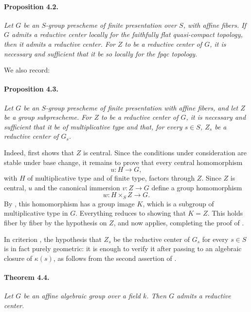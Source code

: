 \paragraph{\textbf{Proposition 4.2.}}
\emph{Let \(G\) be an \(S\)-group prescheme of finite presentation
over \(S\), with affine fibers. If \(G\) admits a reductive center
locally for the faithfully flat quasi-compact topology, then it
admits a reductive center. For \(Z\) to be a reductive center of
\(G\), it is necessary and sufficient that it be so locally for the
fpqc topology.}

We also record:

\paragraph{\textbf{Proposition 4.3.}}
\emph{Let \(G\) be an \(S\)-group prescheme of finite presentation
with affine fibers, and let \(Z\) be a group subprescheme. For \(Z\)
to be a reductive center of \(G\), it is necessary and sufficient
that it be of multiplicative type and that, for every \(s\in S\),
\(Z_s\) be a reductive center of \(G_s\).}

Indeed,  first shows that \(Z\) is central. Since the
conditions under consideration are stable under base change, it
remains to prove that every central homomorphism
\[
  u:H\longrightarrow G,
\]
with \(H\) of multiplicative type and of finite type, factors through
\(Z\). Since \(Z\) is central, \(u\) and the canonical immersion
\(v:Z\to G\) define a group homomorphism
\[
  w:H\times_S Z\longrightarrow G.
\]
By , this homomorphism has a group image \(K\), which is a
subgroup of multiplicative type in \(G\). Everything reduces to
showing that \(K=Z\). This holds fiber by fiber by the hypothesis on
\(Z\), and  now applies, completing the proof of .

In criterion , the hypothesis that \(Z_s\) be the reductive center
of \(G_s\) for every \(s\in S\) is in fact purely geometric: it is
enough to verify it after passing to an algebraic closure of
\(\kappa(s)\), as follows from the second assertion of .

\paragraph{\textbf{Theorem 4.4.}}
\emph{Let \(G\) be an affine algebraic group over a field \(k\).
Then \(G\) admits a reductive center.}

